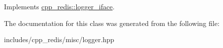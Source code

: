 Implements \hyperlink{classcpp__redis_1_1logger__iface_a0ea8e43a4f2118e77af56cd1cdb21cba}{cpp\+\_\+redis\+::logger\+\_\+iface}.



The documentation for this class was generated from the following file\+:\begin{DoxyCompactItemize}
\item 
includes/cpp\+\_\+redis/misc/logger.\+hpp\end{DoxyCompactItemize}
